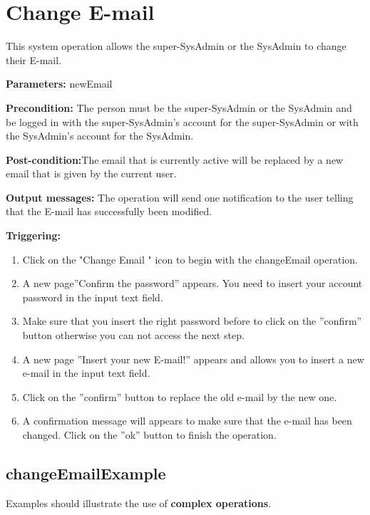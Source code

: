 \section{Change E-mail}
\label{operation:changeEmail}
This system operation allows the super-SysAdmin or the SysAdmin to change
their E-mail.

\begin{description}

\item \textbf{Parameters:} newEmail
\item \textbf{Precondition:} The person must be the super-SysAdmin or the
SysAdmin and be logged in with the super-SysAdmin's account for the
super-SysAdmin or with the SysAdmin's account for the SysAdmin.
\item \textbf{Post-condition:}The email that is currently active will be
replaced by a new email that is given by the current user.
\item \textbf{Output messages:} The operation will send one notification to the
user telling that the E-mail has successfully been modified.


\item \textbf{Triggering:}
\begin{enumerate}
\item Click on the "Change Email " icon to begin with the changeEmail operation. 
\item A new page''Confirm the password'' appears. You need to insert your
account password in the input text field. 
\item Make sure that you insert the right password before to click on the
''confirm'' button otherwise you can not access the next step.
\item A new page ''Insert your new E-mail!'' appears and allows you to
insert a new e-mail in the input text field.
\item Click on the ''confirm'' button to replace the old e-mail by the new one.
\item A confirmation message will appears to make sure that the e-mail
has been changed. Click on the ''ok'' button to finish the operation.
\end{enumerate}

 
\end{description}

 
\subsection{changeEmailExample}
Examples should illustrate the use of \textbf{complex operations}.

